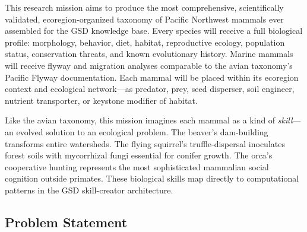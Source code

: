 \documentclass[11pt,letterpaper]{article}
\begin{document}
This research mission aims to produce the most comprehensive, scientifically validated, ecoregion-organized taxonomy of Pacific Northwest mammals ever assembled for the GSD knowledge base. Every species will receive a full biological profile: morphology, behavior, diet, habitat, reproductive ecology, population status, conservation threats, and known evolutionary history. Marine mammals will receive flyway and migration analyses comparable to the avian taxonomy's Pacific Flyway documentation. Each mammal will be placed within its ecoregion context and ecological network---as predator, prey, seed disperser, soil engineer, nutrient transporter, or keystone modifier of habitat.

Like the avian taxonomy, this mission imagines each mammal as a kind of \textit{skill}---an evolved solution to an ecological problem. The beaver's dam-building transforms entire watersheds. The flying squirrel's truffle-dispersal inoculates forest soils with mycorrhizal fungi essential for conifer growth. The orca's cooperative hunting represents the most sophisticated mammalian social cognition outside primates. These biological skills map directly to computational patterns in the GSD skill-creator architecture.

\subsection{Problem Statement}
\end{document}
